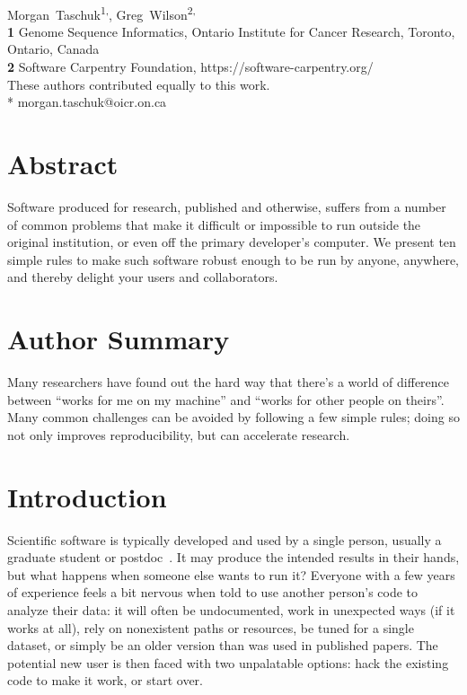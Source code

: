 \documentclass[10pt,letterpaper]{article}
\date{}
\begin{document}
\vspace*{0.2in}

\begin{flushleft}
{\Large
\textbf{}
}
\newline
\\
{Morgan~Taschuk}\textsuperscript{1,\ddag *},
{Greg~Wilson}\textsuperscript{2,\ddag}
\\
\bigskip
\textbf{1} Genome Sequence Informatics, Ontario Institute for Cancer Research, Toronto, Ontario, Canada
\\
\textbf{2} Software Carpentry Foundation, https://software-carpentry.org/
\\
\bigskip
{\ddag} These authors contributed equally to this work.
\\
* morgan.taschuk@oicr.on.ca
\end{flushleft}

\section*{Abstract}

Software produced for research, published and otherwise, suffers from
a number of common problems that make it difficult or impossible to
run outside the original institution, or even off the primary
developer's computer.  We present ten simple rules to make such
software robust enough to be run by anyone, anywhere, and thereby
delight your users and collaborators.

\section*{Author Summary}

Many researchers have found out the hard way that there's a world of
difference between ``works for me on my machine'' and ``works for
other people on theirs''.  Many common challenges can be avoided by
following a few simple rules; doing so not only improves
reproducibility, but can accelerate research.

\section*{Introduction}

Scientific software is typically developed and used by a single
person, usually a graduate student or postdoc~\cite{prins2015}.  It
may produce the intended results in their hands, but what happens when
someone else wants to run it? Everyone with a few years of experience
feels a bit nervous when told to use another person's code to analyze
their data: it will often be undocumented, work in unexpected ways (if
it works at all), rely on nonexistent paths or resources, be tuned for
a single dataset, or simply be an older version than was used in
published papers.  The potential new user is then faced with two
unpalatable options: hack the existing code to make it work, or start
over.
\end{document}
